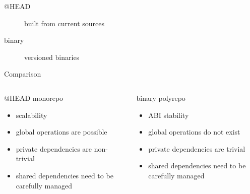 \documentclass[aspectratio=169]{beamer}
\begin{document}
\begin{frame}{}
\Huge
\begin{center}
\begin{description}
    \item[@HEAD] built from current sources \pause
    \item[binary] versioned binaries
\end{description}
\end{center}
\end{frame}

\begin{frame}{Comparison}
\begin{columns}
    \begin{column}{0.5\textwidth}
    @HEAD monorepo
    \begin{itemize}
        \item<2->  scalability 
        \item<3->  global operations are possible
        \item<4->  private dependencies are non-trivial
        \item<5->  shared dependencies need to be carefully managed
    \end{itemize}
    \end{column}
    \begin{column}{0.5\textwidth}
    binary polyrepo
    \begin{itemize}
        \item<2->  ABI stability
        \item<3->  global operations do not exist
        \item<4->  private dependencies are trivial
        \item<5->  shared dependencies need to be carefully managed
    \end{itemize}
    \end{column}
\end{columns}
\end{frame}
\end{document}
